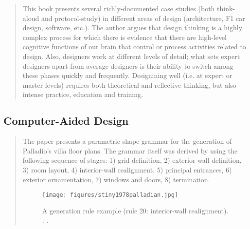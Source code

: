 		\begin{quote}
		\small
		This book presents several richly-documented case studies (both think-aloud and protocol-study)
		in different areas of design (architecture, F1 car design, software, etc.).
		The author argues that design thinking is a highly complex process 
		for which there is evidence that there are high-level cognitive functions
		of our brain that control or process activities related to design.
		Also, designers work at different levels of detail; what sets expert designers apart
		from average designers is their ability to switch among
		these phases quickly and frequently. Designining well (i.e. at expert or master levels) 
		requires both theoretical and 
		reflective thinking, but also intense practice, education and training.
		\end{quote}

\subsection{Computer-Aided Design} 
		\begin{quote}
		\small
		The paper presents a parametric shape grammar for the generation of Palladio's 
		villa floor plans. The grammar itself was derived by using the following sequence of stages:
		1) grid definition, 2) exterior wall definition, 3) room layout, 
		4) interior-wall realignment, 5) principal entrances, 
		6) exterior ornamentation, 7) windows and doors, 8) termination.		
		\begin{figure}[htb]
		\begin{center}
		\texttt{[image: figures/stiny1978palladian.jpg]}
		\caption{
		A generation rule example (rule 20: interior-wall realignment). 
		\citeauthor{stiny1978palladian}: 
		\cite{stiny1978palladian}.}
		\label{fig:stiny1978palladian}
		\end{center}
		\end{figure}
		\end{quote}
		
